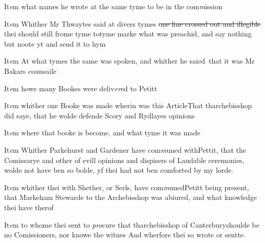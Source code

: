 \documentclass[12pt, a4paper]{book}
\begin{document}
		\ifthenelse{\isodd{\thepage}}
		{\reversemarginpar}
		{\normalmarginpar}
		It\textit{e}m what names he wrote at the same tyme to be in the com\textit{m}ission



		\ifthenelse{\isodd{\thepage}}
		{\reversemarginpar}
		{\normalmarginpar}
		It\textit{e}m Whither Mr Thwaytes said at divers tymes \sout{one line crossed out and illegible} thei should still frome tyme totyme marke what was preachid, and say nothing but noote yt
and send it to hym




		\ifthenelse{\isodd{\thepage}}
		{\reversemarginpar}
		{\normalmarginpar}
		It\textit{e}m At what tymes the same was spoken, and whither he saied that it was Mr Bakars counsaile




		\ifthenelse{\isodd{\thepage}}
		{\reversemarginpar}
		{\normalmarginpar}
		It\textit{e}m howe many Bookes were deliv\textit{er}ed to Petitt



		\ifthenelse{\isodd{\thepage}}
		{\reversemarginpar}
		{\normalmarginpar}
		It\textit{e}m whither one Booke was made wherin was this ArticleThat tharchebisshop  did saye, that he wolde defende Scory
and Rydlayes opinions




		\ifthenelse{\isodd{\thepage}}
		{\reversemarginpar}
		{\normalmarginpar}
		It\textit{e}m where that booke is become, and what tyme it was made



		\ifthenelse{\isodd{\thepage}}
		{\reversemarginpar}
		{\normalmarginpar}
		It\textit{e}m Whither Parkehurst and Gardener have com\textit{m}uned withPettit, that the Comissarye and other of evill opinions
and dispisers of Laudable ceremonies, wolde not have ben so
bolde, yf thei had not ben comforted by my lorde.




		\ifthenelse{\isodd{\thepage}}
		{\reversemarginpar}
		{\normalmarginpar}
		It\textit{e}m whither thei with Shether, or Serls, have com\textit{m}unedPetitt being present, that Markeham Stewarde to the 
Archebisshop was abiured, and what knowledge thei
have therof




		\ifthenelse{\isodd{\thepage}}
		{\reversemarginpar}
		{\normalmarginpar}
		It\textit{e}m to whome thei sent to \textit{pro}cure that tharchebisshop  of Canterburyshoulde be no Comissioners, nor knowe the witnes And wherfore
thei so wrote or sentte.
\end{document}

